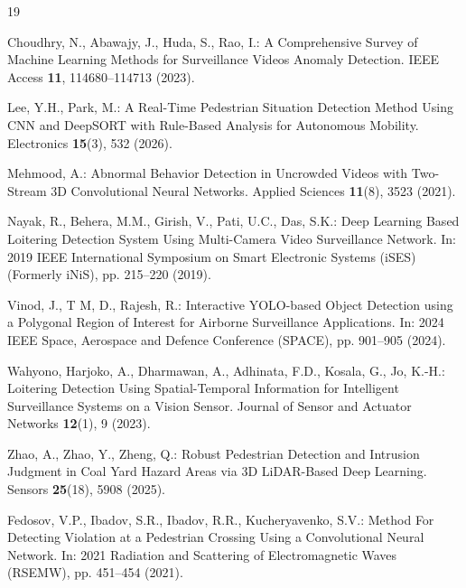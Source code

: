 \documentclass[runningheads]{llncs}
\begin{document}
%
%
%
% 
% 
%
\begin{thebibliography}{19}

Choudhry, N., Abawajy, J., Huda, S., Rao, I.: A Comprehensive Survey of Machine Learning Methods for Surveillance Videos Anomaly Detection. IEEE Access \textbf{11}, 114680--114713 (2023). 

Lee, Y.H., Park, M.: A Real-Time Pedestrian Situation Detection Method Using CNN and DeepSORT with Rule-Based Analysis for Autonomous Mobility. Electronics \textbf{15}(3), 532 (2026). 

Mehmood, A.: Abnormal Behavior Detection in Uncrowded Videos with Two-Stream 3D Convolutional Neural Networks. Applied Sciences \textbf{11}(8), 3523 (2021). 

Nayak, R., Behera, M.M., Girish, V., Pati, U.C., Das, S.K.: Deep Learning Based Loitering Detection System Using Multi-Camera Video Surveillance Network. In: 2019 IEEE International Symposium on Smart Electronic Systems (iSES) (Formerly iNiS), pp. 215--220 (2019). 

Vinod, J., T M, D., Rajesh, R.: Interactive YOLO-based Object Detection using a Polygonal Region of Interest for Airborne Surveillance Applications. In: 2024 IEEE Space, Aerospace and Defence Conference (SPACE), pp. 901--905 (2024). 

Wahyono, Harjoko, A., Dharmawan, A., Adhinata, F.D., Kosala, G., Jo, K.-H.: Loitering Detection Using Spatial-Temporal Information for Intelligent Surveillance Systems on a Vision Sensor. Journal of Sensor and Actuator Networks \textbf{12}(1), 9 (2023). 

Zhao, A., Zhao, Y., Zheng, Q.: Robust Pedestrian Detection and Intrusion Judgment in Coal Yard Hazard Areas via 3D LiDAR-Based Deep Learning. Sensors \textbf{25}(18), 5908 (2025). 

Fedosov, V.P., Ibadov, S.R., Ibadov, R.R., Kucheryavenko, S.V.: Method For Detecting Violation at a Pedestrian Crossing Using a Convolutional Neural Network. In: 2021 Radiation and Scattering of Electromagnetic Waves (RSEMW), pp. 451--454 (2021). 


\end{thebibliography}
\end{document}
